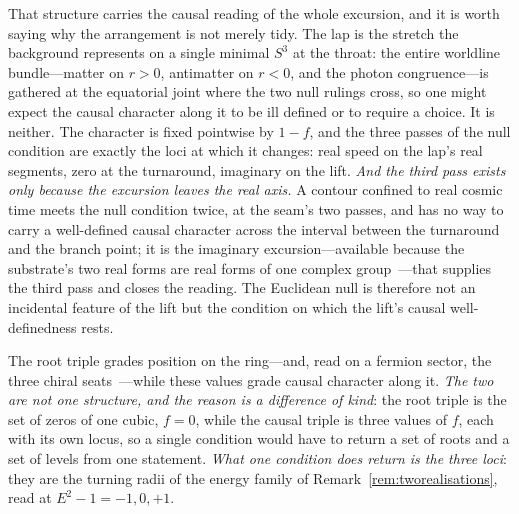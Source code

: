 \documentclass[11pt,a4paper]{article}
\theoremstyle{plain}
\theoremstyle{definition}
\theoremstyle{remark}
\begin{document}
That structure carries the causal reading of the whole excursion, and it is worth saying why the arrangement is
not merely tidy. The lap is the stretch the background represents on a single minimal $S^{3}$ at the throat:
the entire worldline bundle---matter on $r>0$, antimatter on $r<0$, and the photon congruence---is gathered at
the equatorial joint where the two null rulings cross, so one might expect the causal character along it to be
ill defined or to require a choice. It is neither. The character is fixed pointwise by $1-f$, and the three
passes of the null condition are exactly the loci at which it changes: real speed on the lap's real segments,
zero at the turnaround, imaginary on the lift. \emph{And the third pass exists only because the excursion
leaves the real axis.} A contour confined to real cosmic time meets the null condition twice, at the seam's two
passes, and has no way to carry a well-defined causal character across the interval between the turnaround and
the branch point; it is the imaginary excursion---available because the substrate's two real forms are real
forms of one complex group~\cite{JanzenGeometricCore,JanzenBoundary}---that supplies the third pass and closes
the reading. The Euclidean null is therefore not an incidental feature of the lift but the condition on which
the lift's causal well-definedness rests.

The root triple grades position on the ring---and, read on a fermion sector, the three chiral seats~\cite{JanzenMatter}---while these values grade causal character along it. \emph{The two are not one structure, and the reason is a difference of kind}: the root triple is the set of zeros of one cubic, $f=0$, while the causal triple is three values of $f$, each with its own locus, so a single condition would have to return a set of roots and a set of levels from one statement. \emph{What one condition does return is the three loci}: they are the turning radii of the energy family of Remark~\ref{rem:tworealisations}, read at $E^{2}-1=-1,0,+1$.
\end{document}
